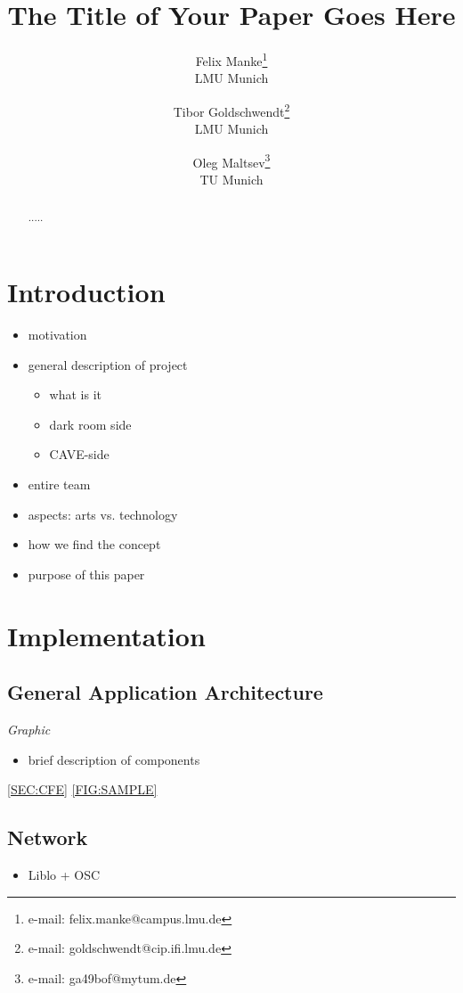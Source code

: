 \documentclass[conference]{acmsiggraph}
\title{The Title of Your Paper Goes Here}
\author{
	Felix Manke\thanks{e-mail: felix.manke@campus.lmu.de}\\LMU Munich
	\and
	Tibor Goldschwendt\thanks{e-mail: goldschwendt@cip.ifi.lmu.de}\\LMU Munich
	\and
	Oleg Maltsev\thanks{e-mail: ga49bof@mytum.de}\\TU Munich
}
\begin{document}

\maketitle

\begin{abstract}

.....

\end{abstract}

\copyrightspace

\section{Introduction}

\begin{itemize}
\item motivation
\item{
	general description of project
	\begin{itemize}
	\item what is it
	\item dark room side
	\item CAVE-side
	\end{itemize}
}
\item entire team
\item aspects: arts vs. technology
\item how we find the concept
\item purpose of this paper
\end{itemize}

\section{Implementation}

\subsection{General Application Architecture}
\textit{Graphic}
\begin{itemize}
\item brief description of components
\end{itemize}

\cref{SEC:CFE}
\cref{FIG:SAMPLE}

\subsection{Network}
\begin{itemize}
\item Liblo + OSC
\end{itemize}
\end{document}

